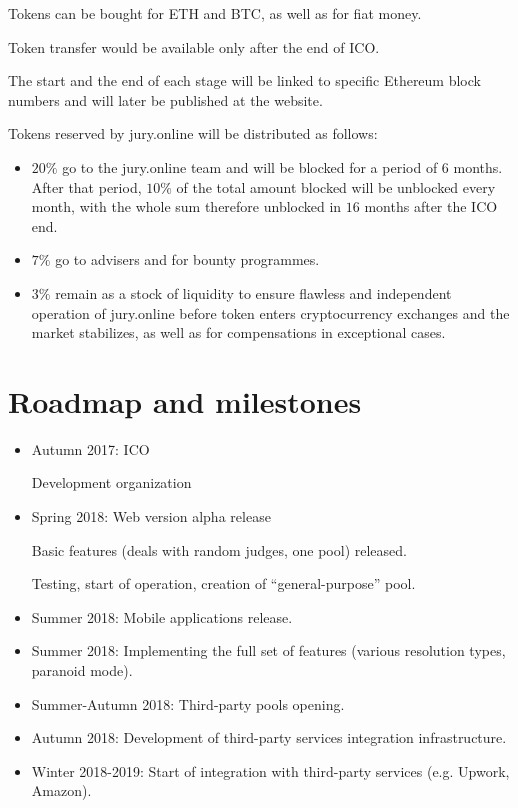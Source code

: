 \documentclass[12pt]{article}
\begin{document}
Tokens can be bought for ETH and BTC, as well as for fiat money.

Token transfer would be available only after the end of ICO.

The start and the end of each stage will be linked to specific Ethereum block numbers and will later be published at the website.

Tokens reserved by jury.online will be distributed as follows:
\begin{itemize}
		\item $20\%$ go to the jury.online team and will be blocked for a period of $6$ months. After that period, $10\%$ of the total amount blocked will be
				unblocked every month, with the whole sum therefore unblocked in $16$ months after the ICO end.

		\item $7\%$ go to advisers and for bounty programmes.
		\item $3\%$ remain as a stock of liquidity to ensure flawless and independent operation of jury.online before token enters cryptocurrency exchanges
				and the market stabilizes, as well as for compensations in exceptional cases.
\end{itemize}

\section{Roadmap and milestones}
\begin{itemize}
		\item Autumn 2017: ICO

				Development organization
		\item Spring 2018: Web version alpha release

				Basic features (deals with random judges, one pool) released.

				Testing, start of operation, creation of “general-purpose” pool.
		\item Summer 2018: Mobile applications release.
		\item Summer 2018: Implementing the full set of features (various resolution types, paranoid mode).
		\item Summer-Autumn 2018: Third-party pools opening.
		\item Autumn 2018: Development of third-party services integration infrastructure.
		\item Winter 2018-2019: Start of integration with third-party services (e.g. Upwork, Amazon).
\end{itemize}
\end{document}
